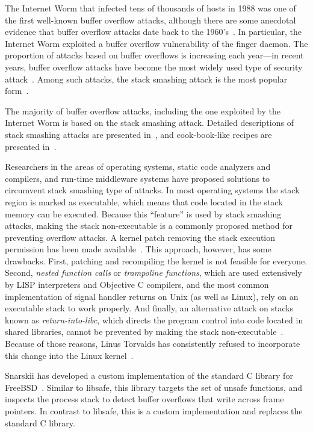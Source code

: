 \documentclass[]{article}
\begin{document}
The Internet Worm that infected tens of thousands of hosts in 1988 was
one of the first well-known buffer overflow attacks, although there
are some anecdotal evidence that buffer overflow attacks date back to
the 1960's~\cite{cowan99}.  In particular, the Internet Worm exploited
a buffer overflow vulnerability of the finger daemon.  The proportion
of attacks based on buffer overflows is increasing each year---in
recent years, buffer overflow attacks have become the most widely used
type of security attack~\cite{wagner00}.  Among such attacks, the
stack smashing attack is the most popular
form~\cite{Instenes:1997:SSW,thomas99}.

The majority of buffer overflow attacks, including the one exploited by the
Internet Worm is based on the stack smashing attack.  Detailed descriptions of
stack smashing attacks are presented in~\cite{smith97,thomas99}, and
cook-book-like recipes are presented in~\cite{Mudge95,aleph198,dildog}.

Researchers in the areas of operating systems, static code analyzers
and compilers, and run-time middleware systems have proposed solutions
to circumvent stack smashing type of attacks.  In most operating
systems the stack region is marked as executable, which means that
code located in the stack memory can be executed.  Because this
``feature'' is used by stack smashing attacks, making the stack
non-executable is a commonly proposed method for preventing overflow
attacks.  A kernel patch removing the stack execution permission has
been made available~\cite{openwall}.  This approach, however, has some
drawbacks.  First, patching and recompiling the kernel is not feasible
for everyone.  Second, {\em nested function calls} or {\em trampoline
functions}, which are used extensively by LISP interpreters and
Objective C compilers, and the most common implementation of signal
handler returns on Unix (as well as Linux), rely on an executable
stack to work properly.  And finally, an alternative attack on stacks
known as {\em return-into-libc}, which directs the program control
into code located in shared libraries, cannot be prevented by making
the stack non-executable~\cite{woj98}.  Because of those reasons, Linus
Torvalds has consistently refused to incorporate this change into the
Linux kernel~\cite{linux98a}.

Snarskii has developed a custom implementation of the standard C
library for FreeBSD~\cite{snarskii97}.  Similar to libsafe, this
library targets the set of unsafe functions, and inspects the process
stack to detect buffer overflows that write across frame pointers.  In
contrast to libsafe, this is a custom implementation and replaces the
standard C library.
\end{document}
